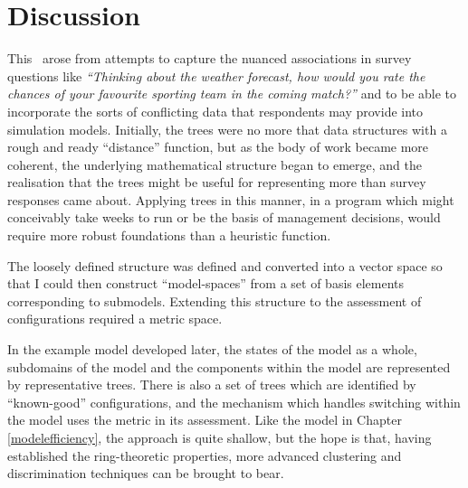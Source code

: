




\section{Discussion}

This \rng\ arose from attempts to capture the nuanced associations in
survey questions like \emph{``Thinking about the weather forecast, how
would you rate the chances of your favourite sporting team in the
coming match?''} and to be able to incorporate the sorts of
conflicting data that respondents may provide into simulation
models. Initially, the trees were no more that data structures with a
rough and ready ``distance'' function, but as the body of work became
more coherent, the underlying mathematical structure began to emerge,
and the realisation that the trees might be useful for representing
more than survey responses came about.  Applying trees in this manner,
in a program which might conceivably take weeks to run or be the basis
of management decisions, would require more robust foundations than a
heuristic function.

The loosely defined structure was defined and converted into a vector
space so that I could then construct ``model-spaces'' from a set of basis
elements corresponding to submodels. Extending this structure to the
assessment of configurations required a metric space.

In the example model developed later, the states of the model as a
whole, subdomains of the model and the components within the model are
represented by representative trees.  There is also a set of trees
which are identified by ``known-good'' configurations, and the
mechanism which handles switching within the model uses the metric in
its assessment.  Like the model in Chapter \ref{modelefficiency}, the
approach is quite shallow, but the hope is that, having established
the ring-theoretic properties, more advanced clustering and
discrimination techniques can be brought to bear.


